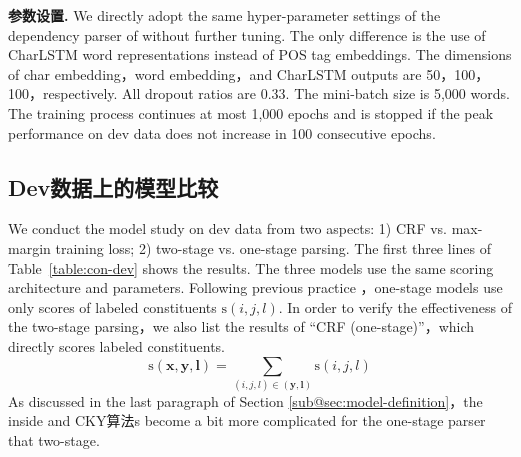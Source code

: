 \noindent\textbf{参数设置.}
We directly adopt the same hyper-parameter settings of the dependency parser of \cite{Timothy-d17-biaffine} without further tuning.
The only difference is the use of CharLSTM word representations instead of POS tag embeddings.
The dimensions of char embedding，word embedding，and CharLSTM outputs are
50，100，100，respectively.
All dropout ratios are 0.33.
The mini-batch size is 5,000 words.
The training process continues at most 1,000 epochs and is stopped if the peak performance on dev data does not increase in 100 consecutive epochs.

\subsection{Dev数据上的模型比较}

We conduct the model study on dev data from two aspects: 1) CRF vs. max-margin training loss; 2) two-stage vs. one-stage parsing.
The first three lines of
Table~\ref{table:con-dev} shows the results.
The three models use the same scoring architecture and parameters.
Following previous practice \cite{stern-etal-2017-minimal}，one-stage models use only scores of labeled constituents $\mathrm{s}(i,j,l)$.
In order to verify the effectiveness of the two-stage parsing，we also list the results of ``CRF (one-stage)''，which directly scores labeled constituents.
\begin{equation} \label{eq:tree-label-score}
    \mathrm{s}(\boldsymbol{x},\boldsymbol{y},\boldsymbol{l}) =
    \sum_{(i,j,l) \in (\boldsymbol{y}, \boldsymbol{l})} \mathrm{s}(i,j,l)
\end{equation}
As discussed in the last paragraph of Section \ref{sub@sec:model-definition}，the inside and CKY算法s become a bit more complicated for the one-stage parser that two-stage.

